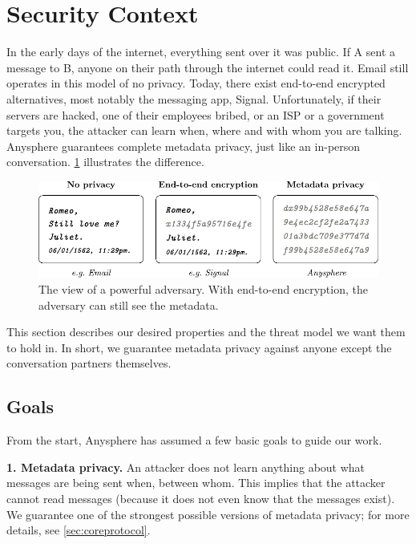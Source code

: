 \section{Security Context}
\label{sec:securitycontext}

In the early days of the internet, everything sent over it was public. If A sent a message to B, anyone on their path through the internet could read it. Email still operates in this model of no privacy. Today, there exist end-to-end encrypted alternatives, most notably the messaging app, Signal. Unfortunately, if their servers are hacked, one of their employees bribed, or an ISP or a government targets you, the attacker can learn when, where and with whom you are talking. Anysphere guarantees complete metadata privacy, just like an in-person conversation. \cref{fig:metadataprivacy} illustrates the difference.

\begin{figure}
    \centering
        \includegraphics[width=\textwidth]{metadata-privacy.pdf}
\caption{The view of a powerful adversary. With end-to-end encryption, the adversary can still see the metadata.}
\label{fig:metadataprivacy}
\end{figure}

This section describes our desired properties and the threat model we want them to hold in. In short, we guarantee metadata privacy against anyone except the conversation partners themselves.

\subsection{Goals}
From the start, Anysphere has assumed a few basic goals to guide our work.

\textbf{1. Metadata privacy.} An attacker does not learn anything about what messages are being sent when, between whom. This implies that the attacker cannot read messages (because it does not even know that the messages exist). We guarantee one of the strongest possible versions of metadata privacy; for more details, see \cref{sec:coreprotocol}.

